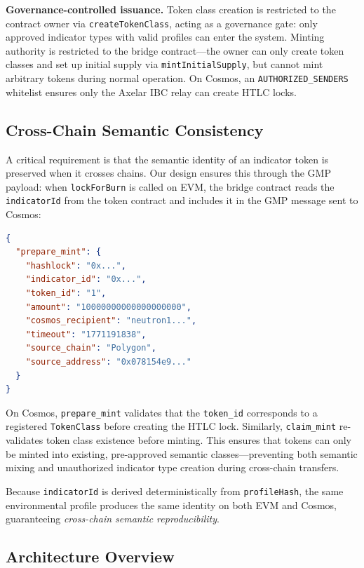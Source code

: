 \documentclass[conference,10pt]{IEEEtran}
\begin{document}
\textbf{Governance-controlled issuance.} Token class creation is restricted to the contract owner via \texttt{createTokenClass}, acting as a governance gate: only approved indicator types with valid profiles can enter the system. Minting authority is restricted to the bridge contract---the owner can only create token classes and set up initial supply via \texttt{mintInitialSupply}, but cannot mint arbitrary tokens during normal operation. On Cosmos, an \texttt{AUTHORIZED\_SENDERS} whitelist ensures only the Axelar IBC relay can create HTLC locks.

\subsection{Cross-Chain Semantic Consistency}
\label{sec:semantic-consistency}

A critical requirement is that the semantic identity of an indicator token is preserved when it crosses chains. Our design ensures this through the GMP payload: when \texttt{lockForBurn} is called on EVM, the bridge contract reads the \texttt{indicatorId} from the token contract and includes it in the GMP message sent to Cosmos:

\begin{lstlisting}[caption={GMP Payload with Indicator Identity}, label=lst:payload, language=json]
{
  "prepare_mint": {
    "hashlock": "0x...",
    "indicator_id": "0x...",
    "token_id": "1",
    "amount": "10000000000000000000",
    "cosmos_recipient": "neutron1...",
    "timeout": "1771191838",
    "source_chain": "Polygon",
    "source_address": "0x078154e9..."
  }
}
\end{lstlisting}

On Cosmos, \texttt{prepare\_mint} validates that the \texttt{token\_id} corresponds to a registered \texttt{TokenClass} before creating the HTLC lock. Similarly, \texttt{claim\_mint} re-validates token class existence before minting. This ensures that tokens can only be minted into existing, pre-approved semantic classes---preventing both semantic mixing and unauthorized indicator type creation during cross-chain transfers.

Because \texttt{indicatorId} is derived deterministically from \texttt{profileHash}, the same environmental profile produces the same identity on both EVM and Cosmos, guaranteeing \textit{cross-chain semantic reproducibility}.

\subsection{Architecture Overview}
\end{document}
